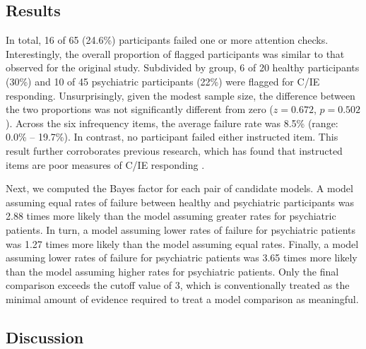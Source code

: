 \documentclass[a4paper,notitlepage,12pt]{article}
\begin{document}
\begin{refsection}[supp]
\subsection*{Results}

In total, 16 of 65 (24.6\%) participants failed one or more attention checks. Interestingly, the overall proportion of flagged participants was similar to that observed for the original study. Subdivided by group, 6 of 20 healthy participants (30\%) and 10 of 45 psychiatric participants (22\%) were flagged for C/IE responding. Unsurprisingly, given the modest sample size, the difference between the two proportions was not significantly different from zero ($z = 0.672$, $p = 0.502$). Across the six infrequency items, the average failure rate was 8.5\% (range: 0.0\% -- 19.7\%). In contrast, no participant failed either instructed item. This result further corroborates previous research, which has found that instructed items are poor measures of C/IE responding \cite{barends2019noncompliant-2, thomas2017validity-2, hauser2016attentive-2}.   

Next, we computed the Bayes factor for each pair of candidate models. A model assuming equal rates of failure between healthy and psychiatric participants was 2.88 times more likely than the model assuming greater rates for psychiatric patients. In turn, a model assuming lower rates of failure for psychiatric patients was 1.27 times more likely than the model assuming equal rates. Finally, a model assuming lower rates of failure for psychiatric patients was 3.65 times more likely than the model assuming higher rates for psychiatric patients. Only the final comparison exceeds the cutoff value of 3, which is conventionally treated as the minimal amount of evidence required to treat a model comparison as meaningful.  

\subsection*{Discussion}


\end{refsection}
\end{document}
